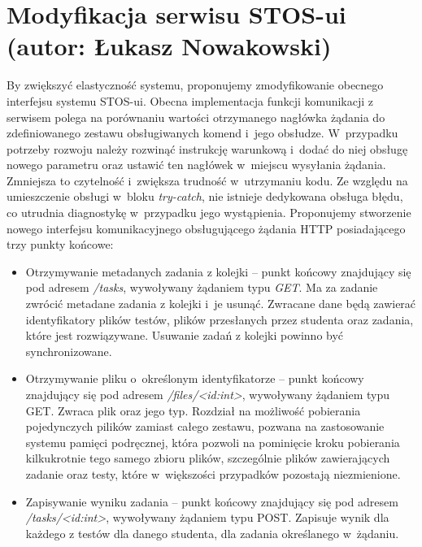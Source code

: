 
\section{Modyfikacja serwisu STOS-ui (autor: Łukasz Nowakowski)}
By zwiększyć elastyczność systemu, proponujemy zmodyfikowanie obecnego interfejsu systemu STOS-ui. Obecna implementacja funkcji komunikacji z serwisem polega na porównaniu wartości otrzymanego nagłówka żądania do zdefiniowanego zestawu obsługiwanych komend i~jego obsłudze. W~przypadku potrzeby rozwoju należy rozwinąć instrukcję warunkową i~dodać do niej obsługę nowego parametru oraz ustawić ten nagłówek w~miejscu wysyłania żądania. Zmniejsza to czytelność i~zwiększa trudność w~utrzymaniu kodu. Ze względu na umieszczenie obsługi w~bloku \textit{try-catch}, nie istnieje dedykowana obsługa błędu, co utrudnia diagnostykę w~przypadku jego wystąpienia. Proponujemy stworzenie nowego interfejsu komunikacyjnego obsługującego żądania HTTP posiadającego trzy punkty końcowe:
\begin{itemize}
    \item Otrzymywanie metadanych zadania z kolejki -- punkt końcowy znajdujący się pod adresem \textit{/tasks}, wywoływany żądaniem typu \textit{GET}. Ma za zadanie zwrócić metadane zadania z kolejki i~je usunąć. Zwracane dane będą zawierać identyfikatory plików testów, plików przesłanych przez studenta oraz zadania, które jest rozwiązywane. Usuwanie zadań z kolejki powinno być synchronizowane.
    \item Otrzymywanie pliku o~określonym identyfikatorze -- punkt końcowy znajdujący się pod adresem \textit{/files/<id:int>}, wywoływany żądaniem typu GET. Zwraca plik oraz jego typ. Rozdział na możliwość pobierania pojedynczych pilików zamiast całego zestawu, pozwana na zastosowanie systemu pamięci podręcznej, która pozwoli na pominięcie kroku pobierania kilkukrotnie tego samego zbioru plików, szczególnie plików zawierających zadanie oraz testy, które w~większości przypadków pozostają niezmienione.
    \item Zapisywanie wyniku zadania -- punkt końcowy znajdujący się pod adresem \textit{/tasks/<id:int>}, wywoływany żądaniem typu POST. Zapisuje wynik dla każdego z testów dla danego studenta, dla zadania określanego w~żądaniu.
\end{itemize}


